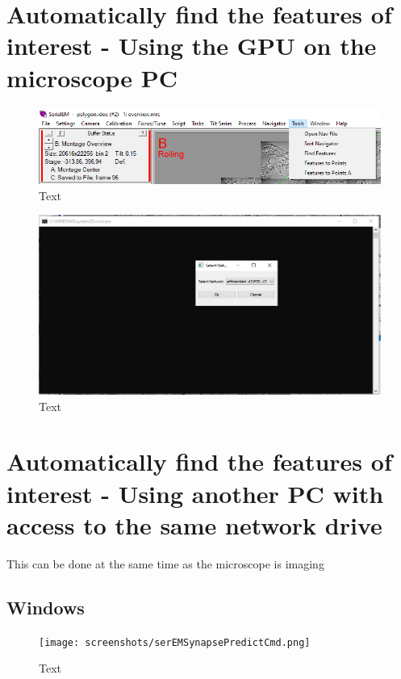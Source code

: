 \documentclass[12pt, a4paper]{scrartcl}
\begin{document}
\section{Automatically find the features of interest - Using the GPU on the microscope PC}


\begin{figure}[H]
\includegraphics[width=\linewidth]{screenshots/Tools.png}
\caption{Text}
\end{figure}

\begin{figure}[H]
\includegraphics[width=\linewidth]{screenshots/FindFeatures.png}
\caption{Text}
\end{figure}

\section{Automatically find the features of interest - Using another PC with access to the same network drive}

This can be done at the same time as the microscope is imaging

\subsection{Windows}

\begin{figure}[H]
\texttt{[image: screenshots/serEMSynapsePredictCmd.png]}
\caption{Text}
\end{figure}
\end{document}
